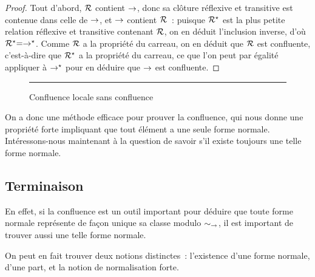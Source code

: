 \begin{proof}
  Tout d'abord, $\mathrel{\mathcal{R}}$ contient $\mathrel{\to}$, donc sa clôture réflexive et
  transitive est contenue dans celle de $\mathrel{\to}$, et $\mathrel{\to}$ contient
  $\mathrel{\mathcal{R}}$~: puisque $\mathrel{\mathcal{R}}^{\mathord{\star}}$ est la plus petite relation
  réflexive et transitive contenant $\mathrel{\mathcal{R}}$, on en déduit l'inclusion
  inverse, d'où $\mathrel{\mathcal{R}}^{\mathord{\star}} = \mathrel{\to}^{\mathord{\star}}$. Comme $\mathrel{\mathcal{R}}$ a la propriété
  du carreau, on en déduit que $\mathrel{\mathcal{R}}$ est confluente, c'est-à-dire que
  $\mathrel{\mathcal{R}}^{\mathord{\star}}$ a la propriété du carreau, ce que l'on peut par égalité
  appliquer à $\mathrel{\to}^{\mathord{\star}}$ pour en déduire que $\mathrel{\to}$ est confluente.
\end{proof}

\begin{figure}[t]
  \centering


  \vspace{0.2cm}
  \hrule
  
  \vspace{0.2cm}
  \caption{Confluence locale sans confluence}
  \label{fig.ctrex.confluence}
\end{figure}

On a donc une méthode efficace pour prouver la confluence, qui nous donne
une propriété forte impliquant que tout élément a une seule forme normale.
Intéressons-nous maintenant à la question de savoir s'il existe toujours une
telle forme normale.

\subsection{Terminaison}

En effet, si la confluence est un outil important pour déduire que toute
forme normale représente de façon unique sa classe modulo $\sim_{\mathord{\mathrel{\to}}}$, il
est important de trouver aussi une telle forme normale.

On peut en fait trouver deux notions distinctes~: l'existence d'une forme
normale, d'une part, et la notion de normalisation forte.


